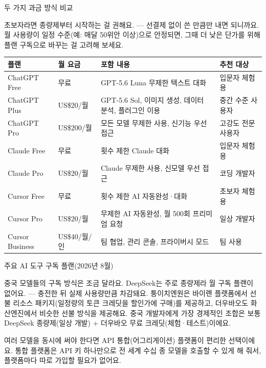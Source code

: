 \begin{center}\small\color{gray}두 가지 과금 방식 비교\end{center}

초보자라면 종량제부터 시작하는 걸 권해요. — 선결제 없이 쓴 만큼만 내면 되니까요. 월 사용량이 일정 수준(예: 매달 50위안 이상)으로 안정되면, 그때 더 낮은 단가를 위해 플랜 구독으로 바꾸는 걸 고려해 보세요.


\begin{center}
\begin{tabularx}{\linewidth}{|X|X|X|X|}
\hline
\textbf{플랜} & \textbf{월 요금} & \textbf{포함 내용} & \textbf{추천 대상} \tabularnewline
\hline
ChatGPT Free & 무료 & GPT-5.6 Luna 무제한 텍스트 대화 & 입문자 체험용 \tabularnewline
ChatGPT Plus & US\$20/월 & GPT-5.6 Sol, 이미지 생성, 데이터 분석, 플러그인 이용 & 중간 수준 사용자 \tabularnewline
ChatGPT Pro & US\$200/월 & 모든 모델 무제한 사용, 신기능 우선 접근 & 고강도 전문 사용자 \tabularnewline
Claude Free & 무료 & 횟수 제한 Claude 대화 & 입문자 체험용 \tabularnewline
Claude Pro & US\$20/월 & Claude 무제한 사용, 신모델 우선 접근 & 코딩 개발자 \tabularnewline
Cursor Free & 무료 & 횟수 제한 AI 자동완성·대화 & 초보자 체험용 \tabularnewline
Cursor Pro & US\$20/월 & 무제한 AI 자동완성, 월 500회 프리미엄 요청 & 일상 개발자 \tabularnewline
Cursor Business & US\$40/월/인 & 팀 협업, 관리 콘솔, 프라이버시 모드 & 팀 사용 \tabularnewline
\hline
\end{tabularx}
\end{center}

\begin{center}\small\color{gray}주요 AI 도구 구독 플랜(2026년 8월)\end{center}

중국 모델들의 구독 방식은 조금 달라요. DeepSeek는 주로 종량제라 월 구독 플랜이 없어요. — 충전한 뒤 실제 사용량만큼 차감돼요. 퉁이치엔원은 바이롄 플랫폼에서 선불 리소스 패키지(일정량의 토큰 크레딧을 할인가에 구매)를 제공하고, 더우바오도 화산엔진에서 비슷한 선불 방식을 제공해요. 중국 개발자에게 가장 경제적인 조합은 보통 DeepSeek 종량제(일상 개발) + 더우바오 무료 크레딧(체험·테스트)이에요.


여러 모델을 동시에 써야 한다면 API 통합(어그리게이션) 플랫폼이 편리한 선택이에요. 통합 플랫폼은 API 키 하나만으로 전 세계 수십 종 모델을 호출할 수 있게 해 줘서, 플랫폼마다 따로 가입할 필요가 없어요.

